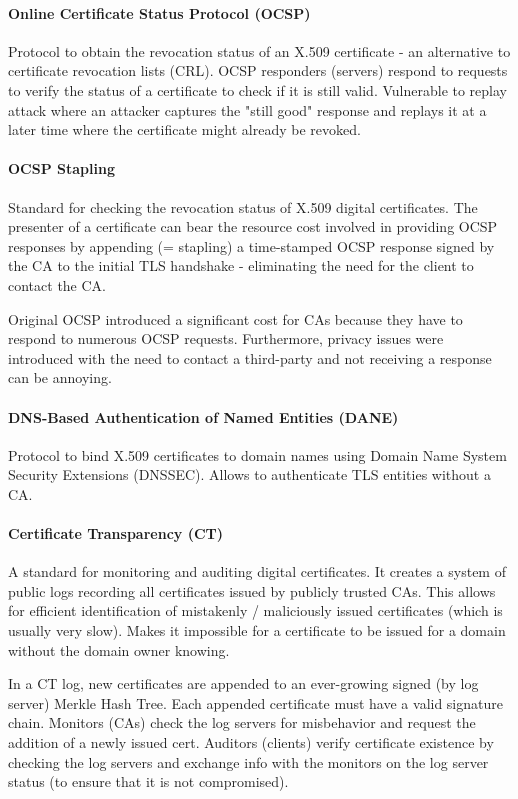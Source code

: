 \paragraph{Online Certificate Status Protocol (OCSP)}
Protocol to obtain the revocation status of an X.509 certificate - an alternative to certificate revocation lists (CRL). OCSP responders (servers) respond to requests to verify the status of a certificate to check if it is still valid. Vulnerable to replay attack where an attacker captures the "still good" response and replays it at a later time where the certificate might already be revoked.

\paragraph{OCSP Stapling}
Standard for checking the revocation status of X.509 digital certificates. The presenter of a certificate can bear the resource cost involved in providing OCSP responses by appending (= stapling) a time-stamped OCSP response signed by the CA to the initial TLS handshake - eliminating the need for the client to contact the CA.

Original OCSP introduced a significant cost for CAs because they have to respond to numerous OCSP requests. Furthermore, privacy issues were introduced with the need to contact a third-party and not receiving a response can be annoying.

\paragraph{DNS-Based Authentication of Named Entities (DANE)}
Protocol to bind X.509 certificates to domain names using Domain Name System Security Extensions (DNSSEC). Allows to authenticate TLS entities without a CA. %

\paragraph{Certificate Transparency (CT)}
A standard for monitoring and auditing digital certificates. It creates a system of public logs recording all certificates issued by publicly trusted CAs. This allows for efficient identification of mistakenly / maliciously issued certificates (which is usually very slow). Makes it impossible for a certificate to be issued for a domain without the domain owner knowing.

In a CT log, new certificates are appended to an ever-growing signed (by log server) Merkle Hash Tree. Each appended certificate must have a valid signature chain. Monitors (CAs) check the log servers for misbehavior and request the addition of a newly issued cert. Auditors (clients) verify certificate existence by checking the log servers and exchange info with the monitors on the log server status (to ensure that it is not compromised).

